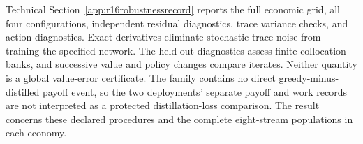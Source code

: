 Technical Section~\ref{app:r16robustnessrecord} reports the full economic
grid, all four configurations, independent residual diagnostics, trace
variance checks, and action diagnostics. Exact derivatives eliminate
stochastic trace noise from training the specified network. The held-out
diagnostics assess finite collocation banks, and successive value and policy
changes compare iterates. Neither quantity is a global value-error
certificate. The family contains no direct greedy-minus-distilled payoff
event, so the two deployments' separate payoff and work records are not
interpreted as a protected distillation-loss comparison. The result concerns
these declared procedures and the complete eight-stream populations in each
economy.
